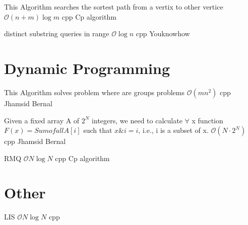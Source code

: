 {This Algorithm searches the sortest path from a vertix to other vertice}
{$\mathcal{O}(n + m)\log{m}$}
{cpp}{}
{Cp algorithm}

{distinct substring queries in range}
{$\mathcal{O}{\log{n}}$}
{cpp}{}
{Youknowhow}

\section{Dynamic Programming}

{This Algorithm solves problem where are groups problems}
{$\mathcal{O}(mn^2)$}
{cpp}{}
{Jhamsid Bernal}
\progress

{Given a fixed array A of $2^N$ integers, we need to calculate $\forall$
x function $F(x) = Sum of all A[i]$ such that $x\&i = i$, i.e., i is a subset 
of x.}
{$\mathcal{O}(N \cdot 2^N)$}
{cpp}{}
{Jhamsid Bernal}

{RMQ}
{$\mathcal{O}{N \log{N}}$}
{cpp}{}
{Cp algorithm}

\section{Other}

{LIS}
{$\mathcal{O}{N \log{N}}$}
{cpp}{}
{}